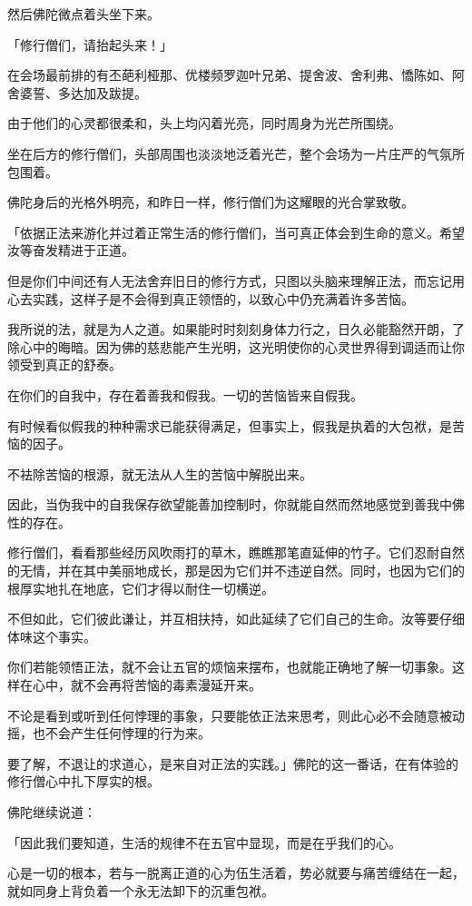 \documentclass[twoside,openany]{book}
\begin{document}
然后佛陀微点着头坐下来。

「修行僧们，请抬起头来！」

在会场最前排的有丕葩利桠那、优楼频罗迦叶兄弟、提舍波、舍利弗、憍陈如、阿舍婆誓、多达加及跋提。

由于他们的心灵都很柔和，头上均闪着光亮，同时周身为光芒所围绕。

坐在后方的修行僧们，头部周围也淡淡地泛着光芒，整个会场为一片庄严的气氛所包围着。

佛陀身后的光格外明亮，和昨日一样，修行僧们为这耀眼的光合掌致敬。

「依据正法来游化并过着正常生活的修行僧们，当可真正体会到生命的意义。希望汝等奋发精进于正道。

但是你们中间还有人无法舍弃旧日的修行方式，只图以头脑来理解正法，而忘记用心去实践，这样子是不会得到真正领悟的，以致心中仍充满着许多苦恼。

我所说的法，就是为人之道。如果能时时刻刻身体力行之，日久必能豁然开朗，了除心中的晦暗。因为佛的慈悲能产生光明，这光明使你的心灵世界得到调适而让你领受到真正的舒泰。

在你们的自我中，存在着善我和假我。一切的苦恼皆来自假我。

有时候看似假我的种种需求已能获得满足，但事实上，假我是执着的大包袱，是苦恼的因子。

不袪除苦恼的根源，就无法从人生的苦恼中解脱出来。

因此，当伪我中的自我保存欲望能善加控制时，你就能自然而然地感觉到善我中佛性的存在。

修行僧们，看看那些经历风吹雨打的草木，瞧瞧那笔直延伸的竹子。它们忍耐自然的无情，并在其中美丽地成长，那是因为它们并不违逆自然。同时，也因为它们的根厚实地扎在地底，它们才得以耐住一切横逆。

不但如此，它们彼此谦让，并互相扶持，如此延续了它们自己的生命。汝等要仔细体味这个事实。

你们若能领悟正法，就不会让五官的烦恼来摆布，也就能正确地了解一切事象。这样在心中，就不会再将苦恼的毒素漫延开来。

不论是看到或听到任何悖理的事象，只要能依正法来思考，则此心必不会随意被动摇，也不会产生任何悖理的行为来。

要了解，不退让的求道心，是来自对正法的实践。」佛陀的这一番话，在有体验的修行僧心中扎下厚实的根。

佛陀继续说道：

「因此我们要知道，生活的规律不在五官中显现，而是在乎我们的心。

心是一切的根本，若与一脱离正道的心为伍生活着，势必就要与痛苦缠结在一起，就如同身上背负着一个永无法卸下的沉重包袱。
\end{document}

